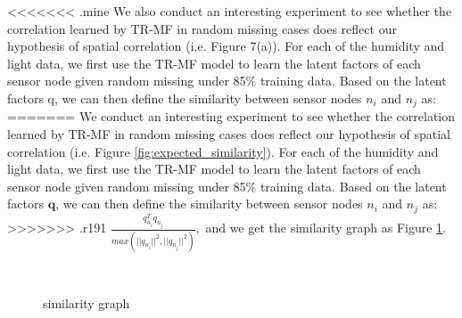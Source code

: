 <<<<<<< .mine
We also conduct an interesting experiment to see whether the correlation learned by TR-MF in random missing cases does reflect our hypothesis of spatial correlation (i.e. Figure 7(a)). For each of the humidity and light data, we first use the TR-MF model to learn the latent factors of each sensor node given random missing under 85\% training data. Based on the latent factors q, we can then define the similarity between sensor nodes $n_i$ and $n_j$ as:
=======
We conduct an interesting experiment to see whether the correlation learned by TR-MF in random missing cases does reflect our hypothesis of spatial correlation (i.e. Figure \ref{fig:expected_similarity}). For each of the humidity and light data, we first use the TR-MF model to learn the latent factors of each sensor node given random missing under 85\% training data. Based on the latent factors $\mathbf{q}$, we can then define the similarity between sensor nodes $n_i$ and $n_j$ as:
>>>>>>> .r191
$\frac{q_{n_i}^T q_{n_j}}{max(||q_{n_i}||^2, ||q_{n_j}||^2)},$
and we get the similarity graph as Figure \ref{fig:similarity}.
\begin{figure}[ftbp]
\centering
{}\\
\hspace{0in}
\caption{similarity graph}
\label{fig:similarity}
\end{figure}


